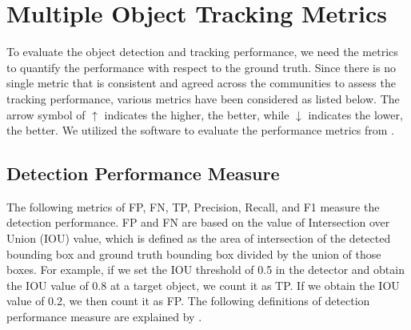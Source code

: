 \section{Multiple Object Tracking Metrics}
\label{sec:background/section_d}

To evaluate the object detection and tracking performance, we need the metrics to quantify the performance with respect to the ground truth. Since there is no single metric that is consistent and agreed across the communities to assess the tracking performance, various metrics have been considered as listed below. The arrow symbol of $\uparrow$ indicates the higher, the better, while $\downarrow$ indicates the lower, the better. We utilized the software to evaluate the performance metrics from \cite{heindl_cheindpy-motmetrics_2021}. 

\subsection{Detection Performance Measure}
The following metrics of FP, FN, TP, Precision, Recall, and F1 measure the detection performance. FP and FN are based on the value of Intersection over Union (IOU) value, which is defined as the area of intersection of the detected bounding box and ground truth bounding box divided by the union of those boxes. For example, if we set the IOU threshold of 0.5 in the detector and obtain the IOU value of 0.8 at a target object, we count it as TP. If we obtain the IOU value of 0.2, we then count it as FP. The following definitions of detection performance measure are explained by \cite{ristani_performance_2016} \cite{milan_mot16_2016}.

